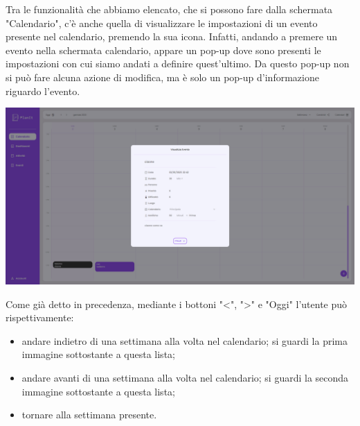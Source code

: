 Tra le funzionalità che abbiamo elencato, che si possono fare dalla schermata "Calendario", c'è anche quella di visualizzare le impostazioni di un evento presente nel calendario, premendo la sua icona. Infatti, andando a premere un evento nella schermata calendario, appare un pop-up dove sono presenti le impostazioni con cui siamo andati a definire quest'ultimo. Da questo pop-up non si può fare alcuna azione di modifica, ma è solo un pop-up d'informazione riguardo l'evento.

\begin{center}
    \includegraphics[width=1\textwidth, height=0.32\textheight]{img/png/FrontEnd/Calendario/impostazioniEvento.png}
\end{center}



Come già detto in precedenza, mediante i bottoni "<", ">" e "Oggi" l'utente può rispettivamente:
\begin{itemize}
    \item andare indietro di una settimana alla volta nel calendario; si guardi la prima immagine sottostante a questa lista;
    \item andare avanti di una settimana alla volta nel calendario; si guardi la seconda immagine sottostante a questa lista;
    \item tornare alla settimana presente.
\end{itemize}


